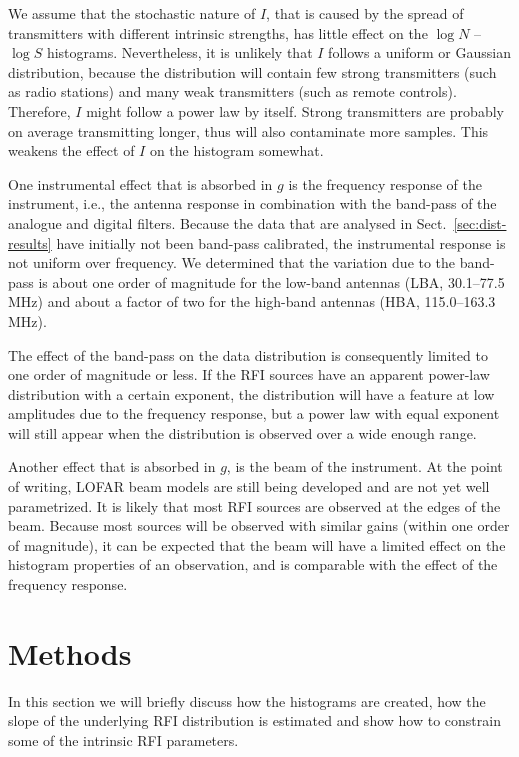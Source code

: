 \documentclass[useAMS,usenatbib]{mn2e}
\begin{document}
We assume that the stochastic nature of $I$, that is caused by the spread of transmitters with different intrinsic strengths, has little effect on the $\log N$ -- $\log S$ histograms. Nevertheless, it is unlikely that $I$ follows a uniform or Gaussian distribution, because the distribution will contain few strong transmitters (such as radio stations) and many weak transmitters (such as remote controls). Therefore, $I$ might follow a power law by itself. Strong transmitters are probably on average transmitting longer, thus will also contaminate more samples. This weakens the effect of $I$ on the histogram somewhat. %

One instrumental effect that is absorbed in $g$ is the frequency response of the instrument, i.e., the antenna response in combination with the band-pass of the analogue and digital filters. Because the data that are analysed in Sect.~\ref{sec:dist-results} have initially not been band-pass calibrated, the instrumental response is not uniform over frequency. We determined that the variation due to the band-pass is about one order of magnitude for the low-band antennas (LBA, 30.1--77.5 MHz) and about a factor of two for the high-band antennas (HBA, 115.0--163.3 MHz).

The effect of the band-pass on the data distribution is consequently limited to one order of magnitude or less. If the RFI sources have an apparent power-law distribution with a certain exponent, the distribution will have a feature at low amplitudes due to the frequency response, but a power law with equal exponent will still appear when the distribution is observed over a wide enough range.

Another effect that is absorbed in $g$, is the beam of the instrument. At the point of writing, LOFAR beam models are still being developed and are not yet well parametrized. It is likely that most RFI sources are observed at the edges of the beam. Because most sources will be observed with similar gains (within one order of magnitude), it can be expected that the beam will have a limited effect on the histogram properties of an observation, and is comparable with the effect of the frequency response.

\section{Methods} \label{sec:distribution-methods}
In this section we will briefly discuss how the histograms are created, how the slope of the underlying RFI distribution is estimated and show how to constrain some of the intrinsic RFI parameters.
\end{document}
